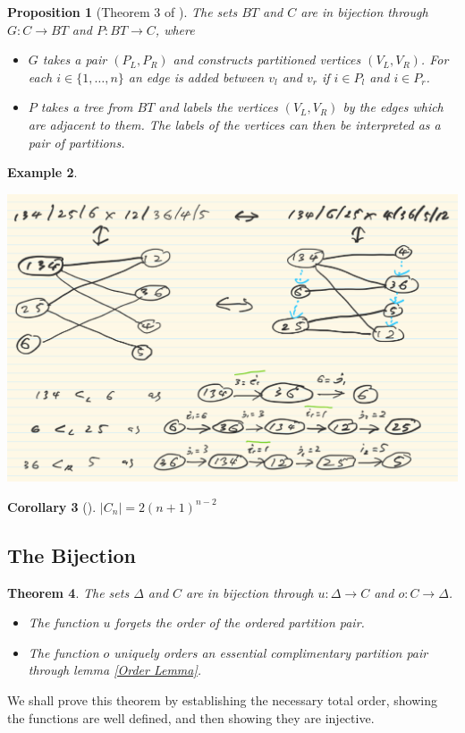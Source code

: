 \documentclass[11pt]{amsart}
\newtheorem{thm}{Theorem}[section]
\newtheorem{corollary}[thm]{Corollary}
\newtheorem{proposition}[thm]{Proposition}
\theoremstyle{definition}
\newtheorem{example}[thm]{Example}
\theoremstyle{remark}
\numberwithin{equation}{section}
\newcommand{\EC}{C}
\newcommand{\OP}{\Delta}
\newcommand{\BT}{BT}
\newcommand{\0}{\color{blue}{\mathsf{0}}}
\begin{document}
\begin{proposition} [Theorem 3 of \cite{kajitani1982number}] \label{EC Graph Bijection}
The sets $\BT$ and $\EC$ are in bijection through $G:\EC \to \BT$ and $P:\BT \to \EC$, where
\begin{itemize}
    \item $G$ takes a pair $(P_L,P_R)$ and constructs partitioned vertices $(V_L,V_R)$. For each $i \in  \{1,\dots,n\}$ an edge is added between $v_l$ and $v_r$ if $i\in P_l$ and $i \in P_r$. 
    \item $P$ takes a tree from $\BT$ and labels the vertices $(V_L,V_R)$ by the edges which are adjacent to them. The labels of the vertices can then be interpreted as a pair of partitions.
\end{itemize}

\end{proposition}

\begin{example}
\phantom{a}\\
\begin{center}
\includegraphics{Images/bijections_example.png}
\end{center}
\end{example}

\begin{corollary}[\cite{kajitani1982number}]
$|\EC_n| = 2(n+1)^{n-2}$

\end{corollary}

\subsection{The Bijection}

\begin{thm}
The sets $\OP$ and $\EC$ are in bijection through $u:\OP \to \EC$ and $o:\EC\to \OP$.
\begin{itemize}
    \item The function $u$ forgets the order of the ordered partition pair.
    \item The function $o$ uniquely orders an essential complimentary partition pair through lemma \ref{Order Lemma}.
\end{itemize}
\end{thm}
We shall prove this theorem by establishing the necessary total order, showing the functions are well defined, and then showing they are injective.
\end{document}
